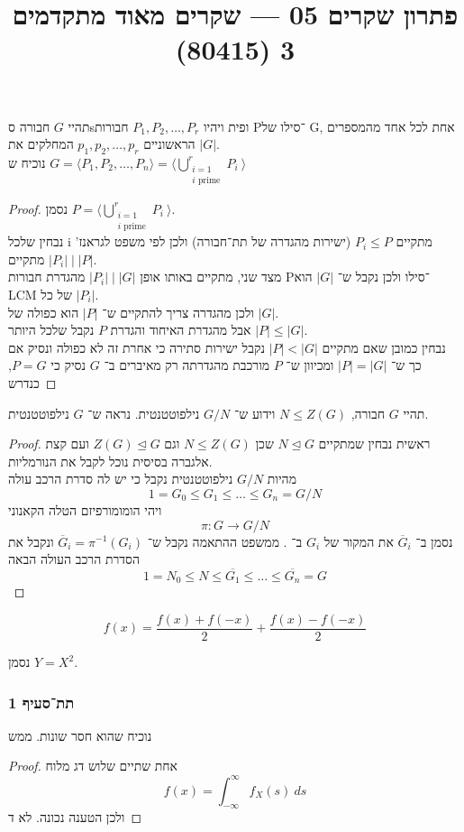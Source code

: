 

\title{פתרון שקרים 05 --- שקרים מאוד מתקדמים 3 (80415)}

\maketitle
\maketitleprint

\question{}
תהיי \( G \) חבורה סsופית ויהיו \( P_1, P_2, \dots, P_r \) חבורות P־סילו של G, אחת לכל אחד מהמספרים הראשוניים \( p_1, p_2, \dots, p_r \) המחלקים את \( |G| \). \\
נוכיח ש \( G = \langle P_1, P_2, \dots, P_n \rangle = \langle \bigcup_{\substack{i=1 \\ i \text{ prime}}}^{r} P_i \ \rangle \)  

\begin{proof}
  נסמן \( P = \langle \bigcup_{\substack{i=1 \\ i \text{ prime}}}^{r} P_i \ \rangle \). \\
  נבחין שלכל i מתקיים \( P_i \leq P \) (ישירות מהגדרה של תת־חבורה) ולכן לפי משפט לגראנז' מתקיים \( |P_i| \mid |P| \). \\
  מצד שני, מתקיים באותו אופן \( |P_i| \mid |G| \) מהגדרת חבורות P־סילו ולכן נקבל ש־ \( |G| \) הוא LCM של כל \( |P_i| \). \\
  ולכן מהגדרה צריך להתקיים ש־ \( |P| \) הוא כפולה של \( |G| \).  \\
  אבל מהגדרת האיחוד והגדרת \( P \) נקבל שלכל היותר \( |P| \leq |G| \). \\
  נבחין כמובן שאם מתקיים \( |P| < |G| \) נקבל ישירות סתירה כי אחרת זה לא כפולה ונסיק אם כך ש־ \( |P| = |G| \) ומכיוון ש־ \( P \) מורכבת מהגדרתה רק מאיברים ב־ \( G \) נסיק כי \( P = G \), כנדרש
\end{proof}

\question{}
תהיי \( G \) חבורה, \( N \leq Z(G) \) וידוע ש־ \( G/N \) נילפוטטנטית. נראה ש־ \( G\) נילפוטטנטית.
\begin{proof}
  ראשית נבחין שמתקיים \( N\trianglelefteq G \) שכן \( N \leq Z(G) \) וגם \( Z(G)\trianglelefteq G\) ועם קצת אלגברה בסיסית נוכל לקבל את הנורמליות.\\
  מהיות \( G/N \) נילפוטטנטית נקבל כי יש לה סדרת הרכב עולה $$1 = G_0 \leq G_1 \leq \ldots \leq G_n = G/N$$ 
  ויהי הומומורפיזם הטלה הקאנוני $$\pi : G \to G/N $$
  נסמן ב־ \( \overline G_i  \) את המקור של \( G_i \) ב־ \pi.
  ממשפט ההתאמה נקבל ש־ \( \overline G_i = \pi^{-1}(G_i)\)
  ונקבל את הסדרת הרכב העולה הבאה
  $$1 = N_0 \leq N \leq \overline{G_1} \leq \ldots \leq \overline{G_n} = G$$ 
  
\end{proof}

\question{}
$$f(x) = \frac{f(x) + f(-x)}{2} + \frac{f(x)-f(-x)}{2}$$

\subquestion{}
נסמן $Y = X^2$.

\subsubsection{תת־סעיף 1}
נוכיח שהוא חסר שונות. ממש
\begin{proof}
	אחת שתיים שלוש דג מלוח
	\[
		f(x) = \int_{-\infty}^{\infty} f_X(s)\ ds
	\]
	ולכן הטענה נכונה.
  לא ד
\end{proof}


